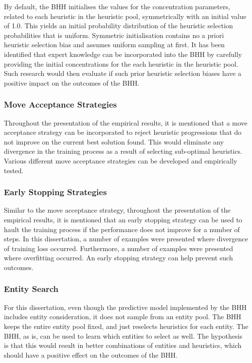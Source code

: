 By default, the \acs{BHH} initialises the values for the concentration parameters, related to each heuristic in the heuristic pool, symmetrically with an initial value of 1.0. This yields an initial probability distribution of the heuristic selection probabilities that is uniform. Symmetric initialisation contains no a priori heuristic selection bias and assumes uniform sampling at first. It has been identified that expert knowledge can be incorporated into the \acs{BHH} by carefully providing the initial concentrations for the each heuristic in the heuristic pool. Such research would then evaluate if such prior heuristic selection biases have a positive impact on the outcomes of the \acs{BHH}.

\subsubsection{Move Acceptance Strategies}
\label{sec:conclusion:further_research:move_acceptance}

Throughout the presentation of the empirical results, it is mentioned that a move acceptance strategy can be incorporated to reject heuristic progressions that do not improve on the current best solution found. This would eliminate any divergence in the training process as a result of selecting sub-optimal heuristics. Various different move acceptance strategies can be developed and empirically tested.

\subsubsection{Early Stopping Strategies}
\label{sec:conclusion:further_research:early_stopping}

Similar to the move acceptance strategy, throughout the presentation of the empirical results, it is mentioned that an early stopping strategy can be used to hault the training process if the performance does not improve for a number of steps. In this dissertation, a number of examples were presented where divergence of training loss occurred. Furthermore, a number of examples were presented where overfitting occurred. An early stopping strategy can help prevent such outcomes.

\subsubsection{Entity Search}
\label{sec:conclusion:further_research:entity_search}
For this dissertation, even though the predictive model implemented by the \acs{BHH} includes entity consideration, it does not sample from an entity pool. The \acs{BHH} keeps the entire entity pool fixed, and just reselects heuristics for each entity. The \acs{BHH}, as is, can be used to learn which entities to select as well. The hypothesis is that this would result in better combinations of entities and heuristics, which should have a positive effect on the outcomes of the \acs{BHH}.


